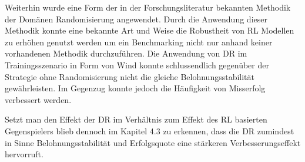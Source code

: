 Weiterhin wurde eine Form der in der Forschungsliteratur bekannten Methodik der Domänen Randomisierung angewendet. 
Durch die Anwendung dieser Methodik konnte eine bekannte Art und Weise die Robustheit von RL Modellen zu erhöhen genutzt werden um ein Benchmarking nicht nur anhand keiner vorhandenen Methodik durchzuführen.
Die Anwendung von DR im Trainingsszenario in Form von Wind konnte schlussendlich gegenüber der Strategie ohne Randomisierung nicht die gleiche Belohnungsstabilität gewährleisten.
Im Gegenzug konnte jedoch die Häufigkeit von Misserfolg verbessert werden.

Setzt man den Effekt der DR im Verhältnis zum Effekt des RL basierten Gegenspielers blieb dennoch im Kapitel 4.3 zu erkennen, dass die DR zumindest in Sinne Belohnungsstabilität und Erfolgsquote eine stärkeren Verbesserungseffekt hervorruft.